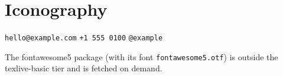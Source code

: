 \documentclass{article}
\begin{document}
\section{Iconography}
\faEnvelope{} \texttt{hello@example.com} \quad
\faPhone*{} \texttt{+1 555 0100} \quad
\faGithub{} \texttt{@example}

The fontawesome5 package (with its font \texttt{fontawesome5.otf})
is outside the texlive-basic tier and is fetched on demand.
\end{document}
